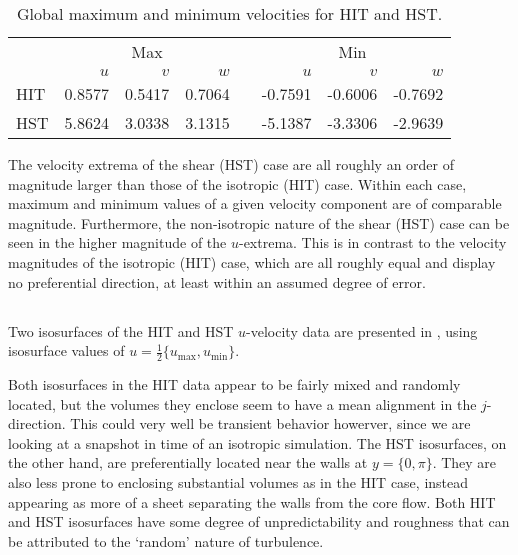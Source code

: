 \documentclass[11pt]{article}
\begin{document}
\begin{table}[h]
\centering
\begin{tabular}{@{}lrrrcrrr@{}}
\toprule
& \multicolumn{3}{c}{Max} && \multicolumn{3}{c}{Min} \\
\cmidrule{2-4} \cmidrule{6-8}
& $u$ & $v$ & $w$ && $u$ & $v$ & $w$ \\
\midrule
HIT & 0.8577 & 0.5417 & 0.7064 && -0.7591 & -0.6006 & -0.7692 \\
HST & 5.8624 & 3.0338 & 3.1315 && -5.1387 & -3.3306 & -2.9639 \\
\bottomrule
\end{tabular}
\vspace{6pt}
\caption{Global maximum and minimum velocities for HIT and HST.}
\label{tab:prob_1_1_max_min_velocities}
\end{table}

The velocity extrema of the shear (HST) case are all roughly an order of magnitude larger than those of the isotropic (HIT) case. Within each case, maximum and minimum values of a given velocity component are of comparable magnitude. Furthermore, the non-isotropic nature of the shear (HST) case can be seen in the higher magnitude of the $u$-extrema. This is in contrast to the velocity magnitudes of the isotropic (HIT) case, which are all roughly equal and display no preferential direction, at least within an assumed degree of error.

\subsection{}

Two isosurfaces of the HIT and HST $u$-velocity data are presented in , using isosurface values of $u=\tfrac{1}{2} \{u_\text{max}, u_\text{min}\}$.

Both isosurfaces in the HIT data appear to be fairly mixed and randomly located, but the volumes they enclose seem to have a mean alignment in the $j$-direction. This could very well be transient behavior howerver, since we are looking at a snapshot in time of an isotropic simulation. The HST isosurfaces, on the other hand, are preferentially located near the walls at $y = \{0, \pi\}$. They are also less prone to enclosing substantial volumes as in the HIT case, instead appearing as more of a sheet separating the walls from the core flow. Both HIT and HST isosurfaces have some degree of unpredictability and roughness that can be attributed to the `random' nature of turbulence.
\end{document}
